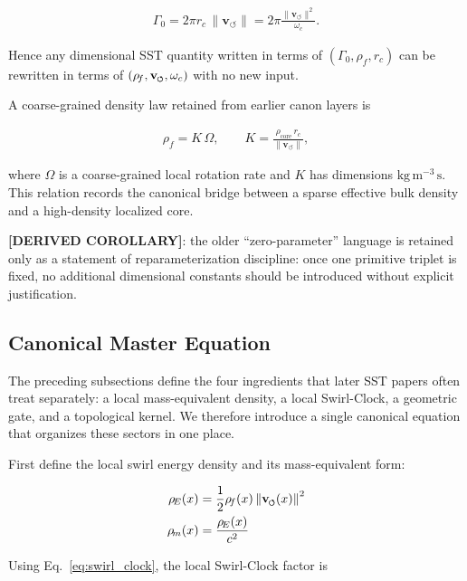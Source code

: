 \documentclass[11pt]{article}
\theoremstyle{definition}
\theoremstyle{plain}
\theoremstyle{remark}
\newcommand{\swirlarrow}{\mathchoice{\mkern-2mu\scriptstyle\boldsymbol{\circlearrowleft}}{\mkern-2mu\scriptstyle\boldsymbol{\circlearrowleft}}{\mkern-2mu\scriptscriptstyle\boldsymbol{\circlearrowleft}}{\mkern-2mu\scriptscriptstyle\boldsymbol{\circlearrowleft}}}
\newcommand{\vswirl}{\mathbf{v}_{\swirlarrow}}
\newcommand{\rhoF}{{\rho_{\!f}}}
\newcommand{\rhoE}{\rho_{\!E}}
\newcommand{\rhoM}{\rho_{\!m}}
\newcommand{\rhocore}{\rho_{\mathrm{core}}}
\newcommand{\rc}{{r_c}}
\newcommand{\vnorm}{\lVert \mathbf{v}_{\!\boldsymbol{\circlearrowleft}} \rVert}
\begin{document}
        \begin{align}
            \Gamma_0 = 2\pi \rc \, \vnorm
            = 2\pi \frac{\vnorm^2}{\omega_c}.
            \label{eq:gamma0_reparam}
        \end{align}

        Hence any dimensional SST quantity written in terms of $(\Gamma_0,\rhoF,\rc)$ can be rewritten in terms of $(\rhoF,\vswirl,\omega_c)$ with no new input.

        A coarse-grained density law retained from earlier canon layers is

        \begin{align}
            \rhoF = K\,\Omega,
            \qquad
            K = \frac{\rhocore \, \rc}{\vnorm},
            \label{eq:coarse_grain_density}
        \end{align}

        where $\Omega$ is a coarse-grained local rotation rate and $K$ has dimensions $\mathrm{kg\,m^{-3}\,s}$. This relation records the canonical bridge between a sparse effective bulk density and a high-density localized core.

        \textbf{[DERIVED COROLLARY]}: the older ``zero-parameter'' language is retained only as a statement of reparameterization discipline: once one primitive triplet is fixed, no additional dimensional constants should be introduced without explicit justification.

    \subsection{Canonical Master Equation}
    \label{sec:master-equation}

        The preceding subsections define the four ingredients that later SST papers often treat separately:
        a local mass-equivalent density, a local Swirl-Clock, a geometric gate, and a topological kernel.
        We therefore introduce a single canonical equation that organizes these sectors in one place.

        First define the local swirl energy density and its mass-equivalent form:

        \begin{align}
            \rhoE(x) &= \frac{1}{2}\rhoF(x)\,\norm{\vswirl(x)}^2 \\
            \rhoM(x) &= \frac{\rhoE(x)}{c^2}
        \end{align}

        Using Eq.~\ref{eq:swirl_clock}, the local Swirl-Clock factor is
\end{document}
